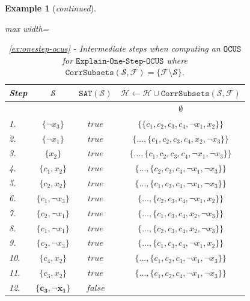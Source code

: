 \documentclass[twoside,11pt]{article}
\newcommand\m[1]{\mathcal{#1}}
\newtheorem{example}{Example}
\newcommand\setstohit{\ensuremath{\m{H} }\xspace}
\newcommand\formula{\ensuremath{\m{F} }\xspace}
\newcommand\mm[1]{\ensuremath{#1}\xspace}
\newcommand\call[1]{\mm{\texttt{#1}}}
\newcommand\sat{\texttt{{SAT}}\xspace}
\newcommand\comus{\mm{\call{OCUS}}}
\newcommand\corrsubsets{\mm{\call{CorrSubsets}}}
\newcommand\onestepo{\ensuremath{\call{Explain-One-Step-OCUS}}\xspace}
\begin{document}
\begin{example}[\textit{continued}]
\begin{table}[!h]
	\centering
	\begin{adjustbox}{max width=\textwidth}
		\begin{tabular}{lccc} 
			Step & $\m{S}$                             & $\sat(\m{S})$ & $\setstohit  \gets \setstohit  \cup  \corrsubsets(\m{S}, \formula) $ \\ 
			\toprule[2pt]
			&        &    &      $\emptyset$                                \\
			\midrule
			1. & $\{ \lnot x_3\}$   &$\mathit{true}$ &  $\{\{c_1, c_2, c_3, c_4, \lnot x_1, x_2 \}\}$\\\midrule
			2. & $\{ \lnot x_1\}$   &$\mathit{true}$ &   $\{  \dots, \{ c_1, c_2, c_3, c_4, x_2, \lnot x_3 \}\}$\\
			\midrule
			3. & $\{ x_2\}$   		&$\mathit{true}$&  $\{ \dots, \{c_1, c_2, c_3, c_4, \lnot x_1, \lnot x_3 \}\}$\\
			\midrule
			4. & $\{ c_1,  x_2\}$   	&$\mathit{true}$ &$\{ \dots, \{c_2, c_3, c_4, \lnot x_1, \lnot x_3 \}\}$\\
			\midrule
			5. & $\{c_2, x_2\}$ 	&$\mathit{true}$ &$\{ \dots, \{c_1, c_3, c_4, \lnot x_1, \lnot x_3 \}\}$\\
			\midrule
			6. & $\{c_1, \lnot x_3\}$ 	&$\mathit{true}$ &$\{ \dots, \{c_2, c_3, c_4, \lnot x_1, x_2 \}\}$\\
			\midrule
			7. & $\{c_2, \lnot x_1\}$ 	&$\mathit{true}$ &$\{ \dots, \{c_1, c_3, c_4,x_2,  \lnot x_3 \}\}$\\
			\midrule
			8. & $\{c_1, \lnot x_1\}$ 	&$\mathit{true}$ &$\{ \dots, \{c_2, c_3, c_4, x_2, \lnot x_3 \}\}$\\
			\midrule
			9. & $\{c_2, \lnot x_3 \}$ 	&$\mathit{true}$ &$\{ \dots, \{c_1, c_3, c_4, \lnot x_1, x_2 \}\}$\\
			\midrule
			10. & $\{ c_4, x_2\}$ 	&$\mathit{true}$ &$\{ \dots, \{c_1, c_2, c_3, \lnot x_1, \lnot x_3 \}\}$\\
			\midrule
			11. & $\{ c_3, x_2\}$ 	&$\mathit{true}$ &$\{ \dots, \{c_1, c_2, c_4, \lnot x_1, \lnot x_3 \}\}$\\
			\midrule
			12. & $\mathbf{\{ c_3, \lnot x_1\}}$ 	&$\mathit{false}$  & \\
			
	\end{tabular}\end{adjustbox}
	\caption{
		\cref{ex:onestep-ocus} - Intermediate steps when computing an \comus for \onestepo where $\corrsubsets(\m{S}, \formula) = \{\formula \setminus \m{S}\}$.	}
	\label{tab:example-explanation-generation-not-incremental}
\end{table}


\end{example}
\end{document}
